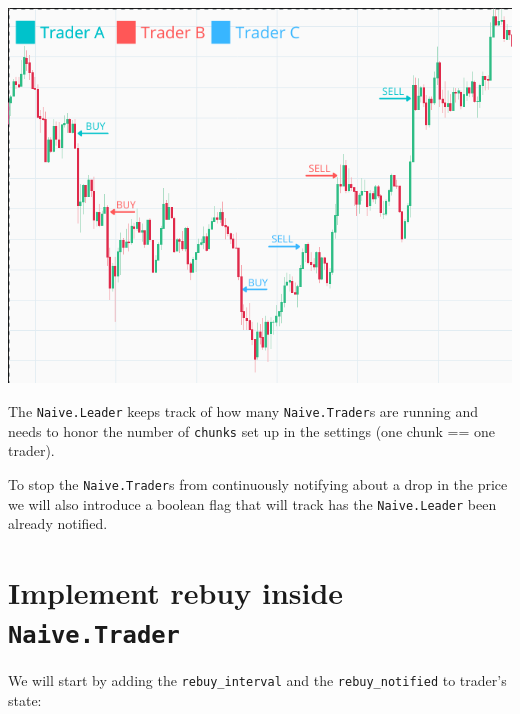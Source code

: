 \documentclass[
  oneside]{book}
\begin{document}
\includegraphics{images/chapter_09_02_multi_traders.png}

The \texttt{Naive.Leader} keeps track of how many \texttt{Naive.Trader}s are running and needs to honor the number of \texttt{chunks} set up in the settings (one chunk == one trader).

To stop the \texttt{Naive.Trader}s from continuously notifying about a drop in the price we will also introduce a boolean flag that will track has the \texttt{Naive.Leader} been already notified.

\hypertarget{implement-rebuy-inside-naive.trader}{%
\section{\texorpdfstring{Implement rebuy inside \texttt{Naive.Trader}}{Implement rebuy inside Naive.Trader}}\label{implement-rebuy-inside-naive.trader}}

We will start by adding the \texttt{rebuy\_interval} and the \texttt{rebuy\_notified} to trader's state:
\end{document}
